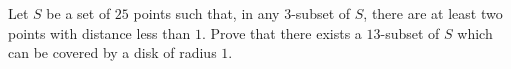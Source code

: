 Let $S$ be a set of $25$ points such that, in any $3$-subset of $S$, there are at least two points with distance less than $1$. Prove that there exists a $13$-subset of $S$ which can be covered by a disk of radius $1$.
